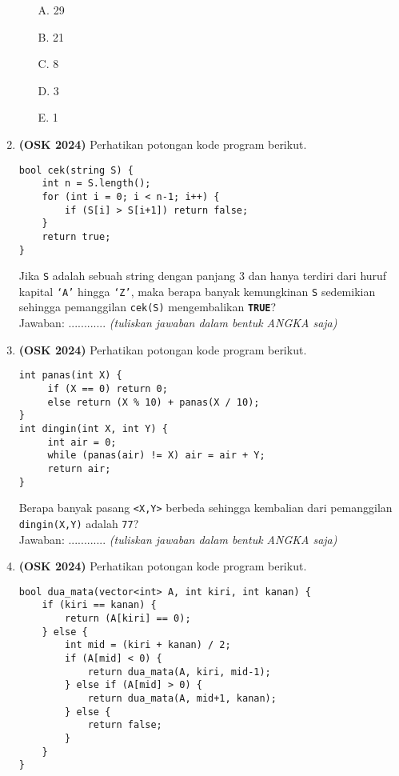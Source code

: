 \documentclass[a4paper]{article}
\begin{document}
\begin{enumerate}
\begin{itemize}
    \item[A.] 29
    \item[B.] 21
    \item[C.] 8
    \item[D.] 3
    \item[E.] 1
\end{itemize}

    \item\textbf{(OSK 2024)} Perhatikan potongan kode program berikut.
    \begin{verbatim}
bool cek(string S) {
    int n = S.length();
    for (int i = 0; i < n-1; i++) {
        if (S[i] > S[i+1]) return false;
    }
    return true;
}
    \end{verbatim}
    Jika \texttt{S} adalah sebuah string dengan panjang 3 dan hanya terdiri dari huruf kapital \texttt{`A'} hingga \texttt{`Z'}, maka berapa banyak kemungkinan \texttt{S} sedemikian sehingga pemanggilan \texttt{cek(S)} mengembalikan \textbf{\texttt{TRUE}}? \\
    Jawaban: ............ \textit{(tuliskan jawaban dalam bentuk ANGKA saja)}

\item\textbf{(OSK 2024)} Perhatikan potongan kode program berikut.
    \begin{verbatim}
int panas(int X) {
     if (X == 0) return 0;
     else return (X % 10) + panas(X / 10);
}
int dingin(int X, int Y) {
     int air = 0;
     while (panas(air) != X) air = air + Y;
     return air; 
}
    \end{verbatim}
Berapa banyak pasang \texttt{<X,Y>} berbeda sehingga kembalian dari pemanggilan \texttt{dingin(X,Y)} adalah \texttt{77}?\\
Jawaban: ............ \textit{(tuliskan jawaban dalam bentuk ANGKA saja)}

\item\textbf{(OSK 2024)} Perhatikan potongan kode program berikut.

\begin{verbatim}
bool dua_mata(vector<int> A, int kiri, int kanan) {
    if (kiri == kanan) {
        return (A[kiri] == 0);
    } else {
        int mid = (kiri + kanan) / 2;
        if (A[mid] < 0) {
            return dua_mata(A, kiri, mid-1);
        } else if (A[mid] > 0) {
            return dua_mata(A, mid+1, kanan);
        } else {
            return false;
        }
    }
}
\end{verbatim}


\end{enumerate}
\end{document}

